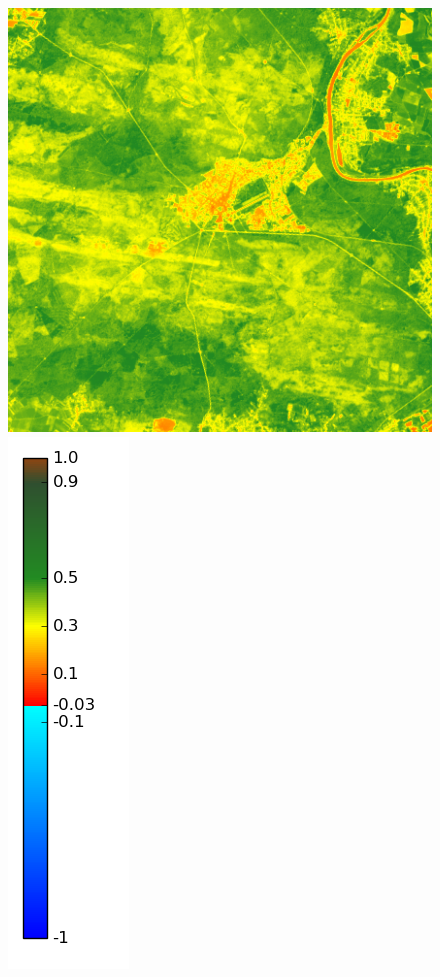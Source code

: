 \documentclass{book}
\begin{document}
\begin{figure}[H]
{\includegraphics[scale=0.2]{images/Fontainebleau/06_ndvi.png}
\includegraphics[scale=0.2]{images/colormap.png}
}
\end{figure}
\end{document}

